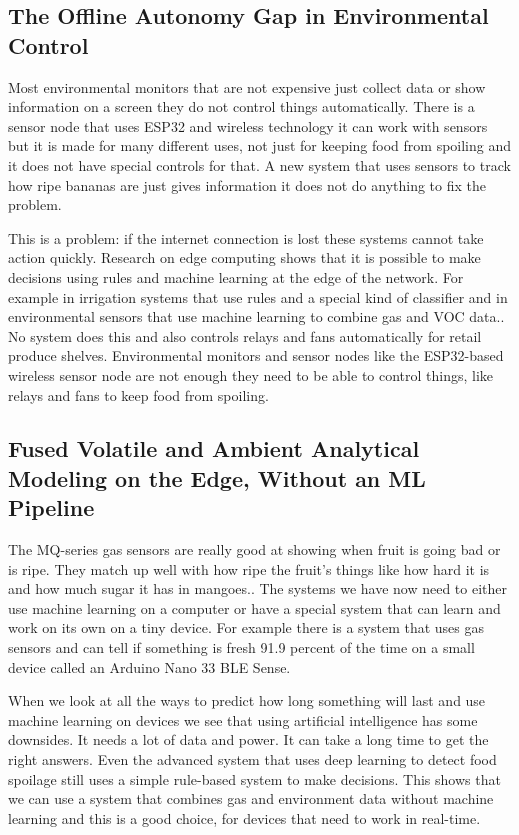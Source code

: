\documentclass[conference]{IEEEtran}
\begin{document}
\subsection{The Offline Autonomy Gap in Environmental Control}
Most environmental monitors that are not expensive just collect data or show information on a screen they do not control things automatically. There is a sensor node that uses ESP32 and wireless technology it can work with sensors but it is made for many different uses, not just for keeping food from spoiling and it does not have special controls for that. A new system that uses sensors to track how ripe bananas are just gives information it does not do anything to fix the problem.

This is a problem: if the internet connection is lost these systems cannot take action quickly. Research on edge computing shows that it is possible to make decisions using rules and machine learning at the edge of the network. For example in irrigation systems that use rules and a special kind of classifier and in environmental sensors that use machine learning to combine gas and VOC data.. No system does this and also controls relays and fans automatically for retail produce shelves. Environmental monitors and sensor nodes like the ESP32-based wireless sensor node are not enough they need to be able to control things, like relays and fans to keep food from spoiling.

\subsection{Fused Volatile and Ambient Analytical Modeling on the Edge, Without an ML Pipeline}
The MQ-series gas sensors are really good at showing when fruit is going bad or is ripe. They match up well with how ripe the fruit's things like how hard it is and how much sugar it has in mangoes.. The systems we have now need to either use machine learning on a computer or have a special system that can learn and work on its own on a tiny device. For example there is a system that uses gas sensors and can tell if something is fresh 91.9 percent of the time on a small device called an Arduino Nano 33 BLE Sense.

When we look at all the ways to predict how long something will last and use machine learning on devices we see that using artificial intelligence has some downsides. It needs a lot of data and power. It can take a long time to get the right answers. Even the advanced system that uses deep learning to detect food spoilage still uses a simple rule-based system to make decisions. This shows that we can use a system that combines gas and environment data without machine learning and this is a good choice, for devices that need to work in real-time.
\end{document}
